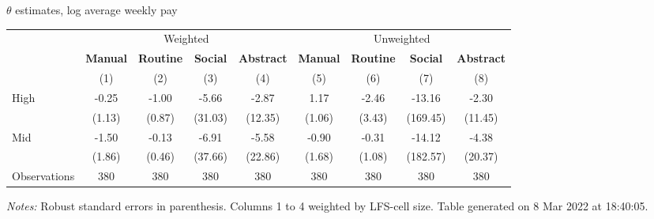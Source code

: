 \begin{center}
\begin{threeparttable}[!h]
\caption{$ \theta $ estimates, log average weekly pay}
\begin{tabular}{lcccccccc}
\toprule
\toprule
& \multicolumn{4}{c}{Weighted} & \multicolumn{4}{c}{Unweighted} \\
&\multicolumn{1}{c}{\textbf{Manual}}&\multicolumn{1}{c}{\textbf{Routine}}&\multicolumn{1}{c}{\textbf{Social}}&\multicolumn{1}{c}{\textbf{Abstract}}&\multicolumn{1}{c}{\textbf{Manual}}&\multicolumn{1}{c}{\textbf{Routine}}&\multicolumn{1}{c}{\textbf{Social}}&\multicolumn{1}{c}{\textbf{Abstract}} \\
\textbf{}&\multicolumn{1}{c}{(1)}&\multicolumn{1}{c}{(2)}&\multicolumn{1}{c}{(3)}&\multicolumn{1}{c}{(4)}&\multicolumn{1}{c}{(5)}&\multicolumn{1}{c}{(6)}&\multicolumn{1}{c}{(7)}&\multicolumn{1}{c}{(8)} \\
\midrule
High                &       -0.25&       -1.00&       -5.66&       -2.87&        1.17&       -2.46&      -13.16&       -2.30\\
                    &      (1.13)&      (0.87)&     (31.03)&     (12.35)&      (1.06)&      (3.43)&    (169.45)&     (11.45)\\
Mid                 &       -1.50&       -0.13&       -6.91&       -5.58&       -0.90&       -0.31&      -14.12&       -4.38\\
                    &      (1.86)&      (0.46)&     (37.66)&     (22.86)&      (1.68)&      (1.08)&    (182.57)&     (20.37)\\
Observations        &         380&         380&         380&         380&         380&         380&         380&         380\\
\bottomrule
\bottomrule
\end{tabular}
\begin{tablenotes}
\item \footnotesize \textit{Notes:} Robust standard errors in parenthesis. Columns 1 to 4 weighted by LFS-cell size. Table generated on  8 Mar 2022 at 18:40:05.
\end{tablenotes}
\end{threeparttable}
\end{center}
